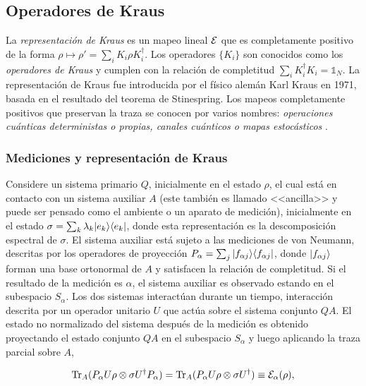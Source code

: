 \subsection{Operadores de Kraus}

 La \textit{representación de Kraus} es un mapeo lineal $\mathcal{E}$ que es completamente positivo de la forma $\rho \mapsto \rho'=\sum_i K_i\rho K_i^\dagger$. Los operadores $\{K_i\}$ son conocidos como los \textit{operadores de Kraus} y cumplen con la relación de completitud $\sum_i K_i^\dagger K_i=\mathds{1}_N$. La representación de Kraus fue introducida por el físico alemán Karl Kraus en 1971, basada en el resultado del teorema de Stinespring. Los mapeos completamente positivos que preservan la traza se conocen por varios nombres: \textit{operaciones cuánticas deterministas o propias, canales cuánticos o mapas estocásticos} {\cite{2007geometry}}.


\subsubsection{Mediciones y representación de Kraus}\label{Medicion_RepresentacionDeKraus}

Considere un sistema primario $Q$, inicialmente en el estado $\rho$,  el cual está en contacto con un sistema auxiliar $A$ (este también es llamado <<ancilla>> y puede ser pensado como el ambiente o un aparato de medición), inicialmente en el estado $\sigma=\sum_k \lambda_k |e_k\rangle \langle e_k|$, donde esta representación es la descomposición espectral de $\sigma$. El sistema auxiliar está sujeto a las mediciones de von Neumann, descritas por los operadores de proyección $P_\alpha=\sum_j |f_{\alpha j}\rangle \langle f_{\alpha j}|$,  donde $|f_{\alpha j}\rangle$ forman una base ortonormal de $A$ y satisfacen la relación de completitud. Si el resultado de la medición es $\alpha$, el sistema auxiliar es observado estando en el subespacio $S_\alpha$. Los dos sistemas interactúan durante un tiempo, interacción descrita por un operador unitario $U$ que actúa sobre el sistema conjunto $QA$. El estado no normalizado del sistema después de la medición es obtenido proyectando el estado conjunto $QA$ en el subespacio $S_\alpha$ y luego aplicando la traza parcial sobre $A$,

\begin{equation}\label{measurement_model}
    {\rm Tr}_A(P_\alpha U \rho \otimes \sigma U^\dagger P_\alpha)= {\rm Tr}_A(P_\alpha U \rho \otimes \sigma U^\dagger)\equiv \mathcal{E}_\alpha(\rho),
\end{equation}


